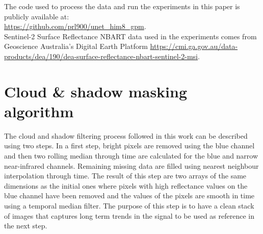 \documentclass[essd, manuscript]{copernicus}
\begin{document}





\codedataavailability{} 
The code used to process the data and run the experiments in this paper is publicly available at: \\
\href{https://github.com/prl900/unet_him8_gpm}{https://github.com/prl900/unet\_him8\_gpm}. \\
Sentinel-2 Surface Reflectance NBART data used in the experiments comes from Geoscience Australia's Digital Earth Platform \href{https://cmi.ga.gov.au/data-products/dea/190/dea-surface-reflectance-nbart-sentinel-2-msi}{https://cmi.ga.gov.au/data-products/dea/190/dea-surface-reflectance-nbart-sentinel-2-msi}. 



\appendix
\section{Cloud \& shadow masking algorithm} %

The cloud and shadow filtering process followed in this work can be described using two steps. In a first step, bright pixels are removed using the blue channel and then two rolling median through time are calculated for the blue and narrow near-infrared channels. Remaining missing data are filled using nearest neighbour interpolation through time. The result of this step are two arrays of the same dimensions as the initial ones where pixels with high reflectance values on the blue channel have been removed and the values of the pixels are smooth in time using a temporal median filter. The purpose of this step is to have a clean stack of images that captures long term trends in the signal to be used as reference in the next step.
\end{document}

